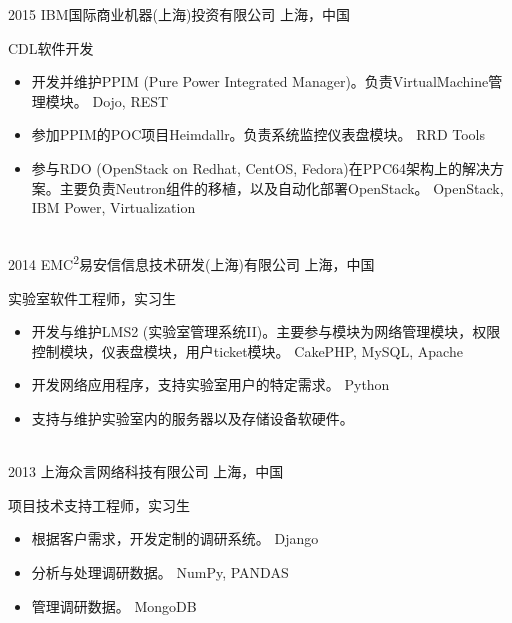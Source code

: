 \documentclass[]{friggeri-cv-cn} %
\begin{document}
\begin{entrylist}
\entry
{2015}
{IBM国际商业机器(上海)投资有限公司}
{上海，中国}
{CDL软件开发
\begin{itemize}
\item 开发并维护PPIM (Pure Power Integrated Manager)。负责VirtualMachine管理模块。{\footnotesize{} Dojo, REST}
\item 参加PPIM的POC项目Heimdallr。负责系统监控仪表盘模块。{\footnotesize{} RRD Tools}
\item 参与RDO (OpenStack on Redhat, CentOS, Fedora)在PPC64架构上的解决方案。主要负责Neutron组件的移植，以及自动化部署OpenStack。{\footnotesize{} OpenStack, IBM Power, Virtualization}
\end{itemize}
}
\\
\entry
{2014}
{EMC\textsuperscript{2}易安信信息技术研发(上海)有限公司}
{上海，中国}
{实验室软件工程师，实习生
\begin{itemize}
\item 开发与维护LMS2 (实验室管理系统II)。主要参与模块为网络管理模块，权限控制模块，仪表盘模块，用户ticket模块。 {\footnotesize{} CakePHP, MySQL, Apache}
\item 开发网络应用程序，支持实验室用户的特定需求。{\footnotesize{} Python}
\item 支持与维护实验室内的服务器以及存储设备软硬件。
\end{itemize}
}
\\
\entry
{2013}
{上海众言网络科技有限公司}
{上海，中国}
{项目技术支持工程师，实习生
\begin{itemize}
\item 根据客户需求，开发定制的调研系统。{\footnotesize{} Django}
\item 分析与处理调研数据。{\footnotesize{} NumPy, PANDAS}
\item 管理调研数据。{\footnotesize{} MongoDB}
\end{itemize}
}
\end{entrylist}

\end{document}
